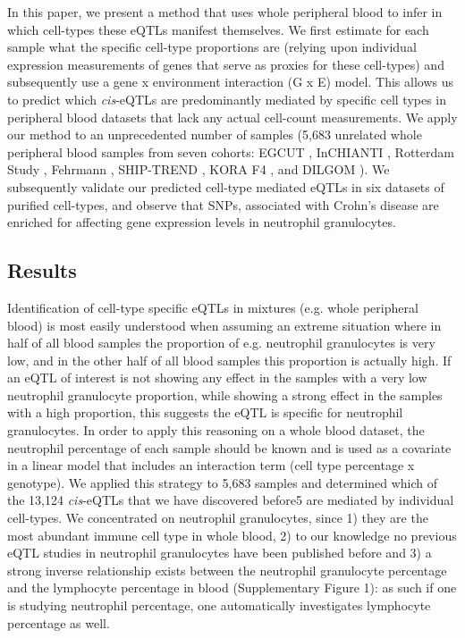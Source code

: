   In this paper, we present a method that uses whole peripheral blood to infer in which cell-types these 
  eQTLs manifest themselves. We first estimate for each sample what the specific cell-type proportions 
  are (relying upon individual expression measurements of genes that serve as proxies for these cell-types) 
  and subsequently use a gene x environment interaction (G x E) model. This allows us to predict which 
  \emph{cis}-eQTLs are predominantly mediated by specific cell types in peripheral blood datasets that lack 
  any actual cell-count measurements. We apply our method to an unprecedented number of samples (5,683 
  unrelated whole peripheral blood samples from seven cohorts: EGCUT \cite{Metspalu:2004}, InCHIANTI 
  \cite{Tanaka:2009}, Rotterdam Study \cite{Hofman:2011}, Fehrmann \cite{Lude:2011}, SHIP-TREND 
  \cite{Teumer:2011}, KORA F4 \cite{Powell:2012, Mehta:2013}, and DILGOM \cite{Inouye:2010}). We 
  subsequently validate our predicted cell-type mediated eQTLs in six datasets of purified cell-types, and 
  observe that SNPs, associated with Crohn's disease are enriched for affecting gene expression levels in 
  neutrophil granulocytes.

  \subsection{Results}
  Identification of cell-type specific eQTLs in mixtures (e.g. whole peripheral blood) is most easily 
  understood when assuming an extreme situation where in half of all blood samples the proportion of 
  e.g. neutrophil granulocytes is very low, and in the other half of all blood samples this proportion 
  is actually high. If an eQTL of interest is not showing any effect in the samples with a very low 
  neutrophil granulocyte proportion, while showing a strong effect in the samples with a high proportion, 
  this suggests the eQTL is specific for neutrophil granulocytes. In order to apply this reasoning on 
  a whole blood dataset, the neutrophil percentage of each sample should be known and is used as a 
  covariate in a linear model that includes an interaction term (cell type percentage x genotype). 
  We applied this strategy to 5,683 samples and determined which of the 13,124 \emph{cis}-eQTLs that we have 
  discovered before5 are mediated by individual cell-types. We concentrated on neutrophil granulocytes, 
  since 1) they are the most abundant immune cell type in whole blood, 2) to our knowledge no previous 
  eQTL studies in neutrophil granulocytes have been published before and 3) a strong inverse 
  relationship exists between the neutrophil granulocyte percentage and the lymphocyte percentage in 
  blood (Supplementary Figure 1): as such if one is studying neutrophil percentage, one automatically 
  investigates lymphocyte percentage as well.


